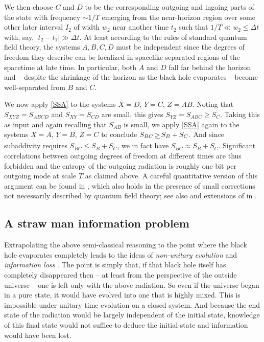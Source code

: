 \documentclass[10pt]{article}
\def\gsim{\, \rlap{$>$}{\lower 1.1ex\hbox{$\sim$}}\,}
\begin{document}
We then choose $C$ and $D$ to be the corresponding outgoing and ingoing parts of the state with frequency $\sim 1/T$ emerging from the near-horizon region over some other later interval $I_2$ of width $w_2$ near another time $t_2$ such that $1/T \ll w_2 \le \Delta t$ with, say, $|t_2 - t_1| \gg \Delta t$. At least according to the rules of standard quantum field theory, the systems $A,B,C,D$ must be independent since the degrees of freedom they describe can be localized in spacelike-separated regions of the spacetime at late time.  In particular, both $A$ and $D$ fall far behind the horizon and -- despite the shrinkage of the horizon as the black hole evaporates -- become well-separated from $B$ and $C$.

We now apply \eqref{SSA} to the systems $X=D$, $Y=C$, $Z=AB$.  Noting that $S_{XYZ} = S_{ABCD}$ and $S_{XY} = S_{CD}$ are small, this gives $S_{YZ} = S_{ABC} \ge S_C$.  Taking this as input and again recalling that $S_{AB}$ is small, we apply \eqref{SSA} again to the systems  $X=A$, $Y=B$, $Z=C$ to conclude $S_{BC} \gsim S_B + S_C.$  And since subaddivity requires $S_{BC} \le S_B + S_C$, we in fact have $S_{BC} \approx S_B + S_C$. Significant correlations between outgoing degrees of freedom at different times are thus forbidden and the entropy of the outgoing radiation is roughly one bit per outgoing mode at scale $T$ as claimed above.  A careful quantitative version of this argument can be found in \cite{Mathur:2009hf}, which also holds in the presence of small corrections not necessarily described by quantum field theory; see also \cite{Sorkin:1997ja,Giddings:2006sj,Braunstein:2009my}  and extensions of \cite{Mathur:2009hf} in \cite{Giddings:2012dh}.

\subsection{A straw man information problem}
\label{straw}

Extrapolating the above semi-classical reasoning to the point where the black hole evaporates completely leads to the ideas of  {\it non-unitary evolution} and {\it information loss} \cite{Hawking:1976ra}.  The point is simply that, if that black hole itself has completely disappeared then -- at least from the perspective of the outside universe -- one is left only with the above radiation.  So even if the universe began in a pure state, it would have evolved into one that is highly mixed.  This is impossible under unitary time evolution on a closed system.  And because the end state of the radiation would be largely independent of the initial state, knowledge of this final state would not suffice to deduce the initial state and information would have been lost.
\end{document}
